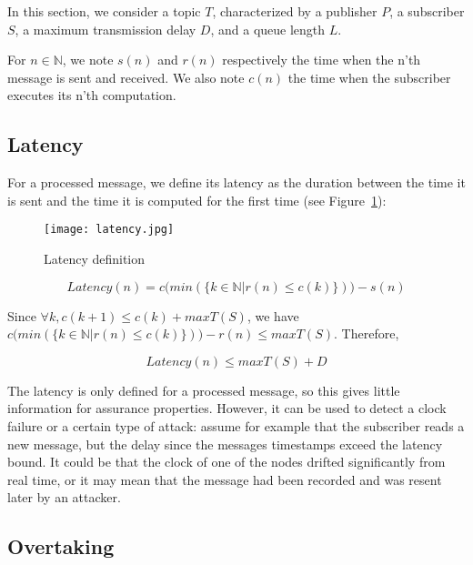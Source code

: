 In this section, we consider a topic $T$, characterized by a publisher $P$, a subscriber $S$, a maximum transmission delay $D$, and a queue length $L$.

For $n \in \mathbb{N}$, we note $s(n)$ and $r(n)$ respectively the time when the n'th message is sent and received. We also note $c(n)$ the time when the subscriber executes its n'th computation.

\subsection{Latency}

For a processed message, we define its latency as the duration between the time it is sent and the time it is computed for the first time (see Figure~\ref{latency}):

\begin{figure}[h]
\begin{center}
\texttt{[image: latency.jpg]}
\caption{Latency definition}\label{latency}
\end{center}
\end{figure}

\begin{defin} 
\[ Latency(n) = c \Big ( min(\{k \in \mathbb{N} | r(n) \leq c(k)\}) \Big ) - s(n) \]
\end{defin}

Since $\forall k, c(k + 1) \leq c(k) + maxT(S)$, we have
$c \big ( min(\{k \in \mathbb{N} | r(n) \leq c(k)\}) \big ) - r(n) \leq maxT(S)$. Therefore,
\begin{thm}
\[ Latency(n) \leq maxT(S) + D \]
\end{thm}

The latency is only defined for a processed message, so this gives little information for assurance properties. However, it can be used to detect a clock failure or a certain type of attack: 
assume for example that the subscriber reads a new message, but the delay since the messages timestamps exceed the latency bound. 
It could be that the clock of one of the nodes drifted significantly from real time, or it may mean that the message had been recorded and was resent later by an attacker.



\subsection{Overtaking}

